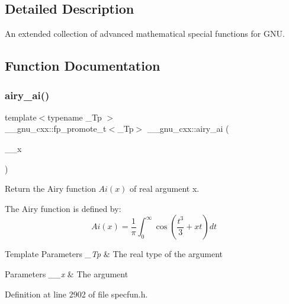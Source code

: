 \subsection{Detailed Description}
An extended collection of advanced mathematical special functions for G\+NU. 

\subsection{Function Documentation}
\mbox{\label{group__mathsf__gnu_gac84f8c4ad00ee677ad4d0b785925d983}} 
\subsubsection{\texorpdfstring{airy\+\_\+ai()}{airy\_ai()}\hspace{0.1cm}{\footnotesize\ttfamily [1/2]}}
{\footnotesize\ttfamily template$<$typename \+\_\+\+Tp $>$ \\
\+\_\+\+\_\+gnu\+\_\+cxx\+::fp\+\_\+promote\+\_\+t$<$\+\_\+\+Tp$>$ \+\_\+\+\_\+gnu\+\_\+cxx\+::airy\+\_\+ai (\begin{DoxyParamCaption}\item[{\+\_\+\+Tp}]{\+\_\+\+\_\+x }\end{DoxyParamCaption})\hspace{0.3cm}{\ttfamily [inline]}}

Return the Airy function $ Ai(x) $ of real argument {\ttfamily x}.

The Airy function is defined by\+: \[ Ai(x) = \frac{1}{\pi}\int_0^\infty \cos \left(\frac{t^3}{3} + xt \right)dt \]


\begin{DoxyTemplParams}{Template Parameters}
{\em \+\_\+\+Tp} & The real type of the argument \\
\hline
\end{DoxyTemplParams}

\begin{DoxyParams}{Parameters}
{\em \+\_\+\+\_\+x} & The argument \\
\hline
\end{DoxyParams}


Definition at line 2902 of file specfun.\+h.

